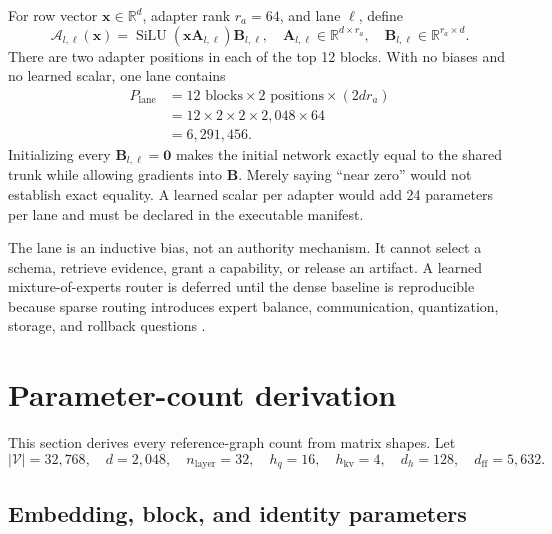 \documentclass[10pt,letterpaper]{article}
\newcommand{\R}{\mathbb{R}}
\newcommand{\1}{\mathbb{1}}
\newcommand{\vect}[1]{\bm{#1}}
\newcommand{\mat}[1]{\bm{#1}}
\begin{document}
For row vector $\vect x\in\R^d$, adapter rank $r_a=64$, and lane $\ell$, define
\begin{equation}
  \mathcal A_{l,\ell}(\vect x)
  =\operatorname{SiLU}(\vect x\mat A_{l,\ell})\mat B_{l,\ell},
  \quad
  \mat A_{l,\ell}\in\R^{d\times r_a},\quad
  \mat B_{l,\ell}\in\R^{r_a\times d}.
  \label{eq:adapter}
\end{equation}
There are two adapter positions in each of the top 12 blocks.  With no biases and no learned scalar,
one lane contains
\begin{align}
  P_{\mathrm{lane}}
  &=12\text{ blocks}\times2\text{ positions}\times(2dr_a)\\
  &=12\times2\times2\times2{,}048\times64\\
  &=6{,}291{,}456.
  \label{eq:lane-count}
\end{align}
Initializing every $\mat B_{l,\ell}=\mat 0$ makes the initial network exactly equal to the shared
trunk while allowing gradients into $\mat B$.  Merely saying ``near zero'' would not establish exact
equality.  A learned scalar per adapter would add 24 parameters per lane and must be declared in the
executable manifest.

The lane is an inductive bias, not an authority mechanism.  It cannot select a schema, retrieve
evidence, grant a capability, or release an artifact.  A learned mixture-of-experts router is deferred
until the dense baseline is reproducible because sparse routing introduces expert balance,
communication, quantization, storage, and rollback questions \cite{shazeer2017moe,fedus2022switch}.

\section{Parameter-count derivation}

This section derives every reference-graph count from matrix shapes.  Let
\begin{equation}
  |\mathcal V|=32{,}768,\quad d=2{,}048,\quad n_{\mathrm{layer}}=32,
  \quad h_q=16,\quad h_{\mathrm{kv}}=4,\quad d_h=128,
  \quad d_{\mathrm{ff}}=5{,}632.
\end{equation}

\subsection{Embedding, block, and identity parameters}
\end{document}
